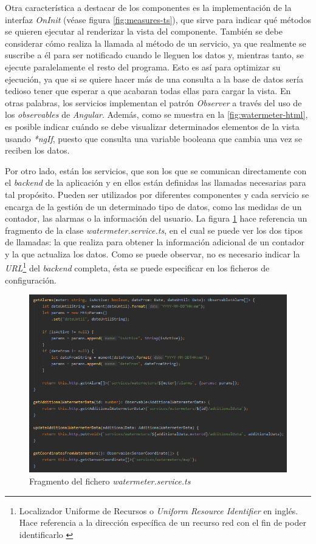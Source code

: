 \documentclass[pdftex,11pt,a4paper]{book}
\begin{document}
Otra característica a destacar de los componentes es la implementación de la interfaz \textit{OnInit} (véase figura \ref{fig:measures-ts}), que sirve para indicar qué métodos se quieren ejecutar al renderizar la vista del componente. También se debe considerar cómo realiza la llamada al método de un servicio, ya que realmente se suscribe a él para ser notificado cuando le lleguen los datos y, mientras tanto, se ejecute paralelamente el resto del programa. Esto es así para optimizar su ejecución, ya que si se quiere hacer más de una consulta a la base de datos sería tedioso tener que esperar a que acabaran todas ellas para cargar la vista. En otras palabras, los servicios implementan el patrón \textit{Observer} a través del uso de los \textit{observables} de \textit{Angular}. Además, como se muestra en la \ref{fig:watermeter-html}, es posible indicar cuándo se debe visualizar determinados elementos de la vista usando \textit{*ngIf}, puesto que consulta una variable booleana que cambia una vez se reciben los datos. 


Por otro lado, están los servicios, que son los que se comunican directamente con el \textit{backend} de la aplicación y en ellos están definidas las llamadas necesarias para tal propósito. Pueden ser utilizados por diferentes componentes y cada servicio se encarga de la gestión de un determinado tipo de datos, como las medidas de un contador, las alarmas o la información del usuario. La figura \ref{fig:service-watermeter} hace referencia un fragmento de la clase \textit{watermeter.service.ts}, en el cual se puede ver los dos tipos de llamadas: la que realiza para obtener la información adicional de un contador y la que actualiza los datos. Como se puede observar, no es necesario indicar la \textit{URL}\footnote{Localizador Uniforme de Recursos o \textit{Uniform Resource Identifier} en inglés. Hace referencia a la dirección específica de un recurso red con el fin de poder identificarlo \cite{bib:url}} del \textit{backend} completa, ésta se puede especificar en los ficheros de configuración.

 \begin{figure}[h]
 \centering
 \includegraphics [scale=0.73] {images/implementacion/service-watermeter.png}
 \caption{Fragmento del fichero \textit{watermeter.service.ts}} \label{fig:service-watermeter}
 \end{figure}
\end{document}
